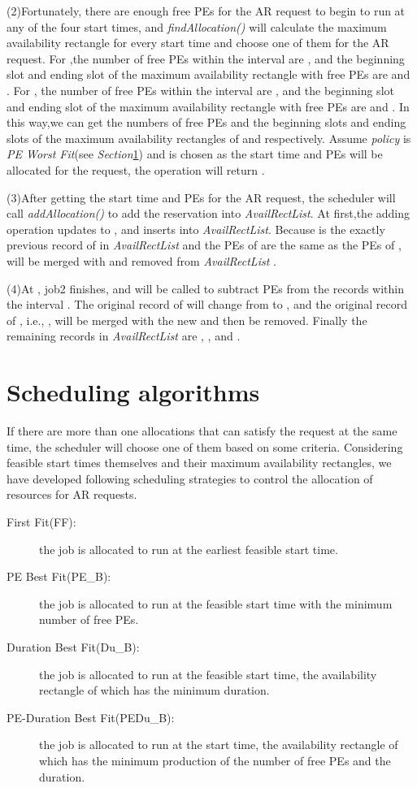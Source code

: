 \documentclass[preprint,12pt]{elsarticle}
\begin{document}
(2)Fortunately, there are enough free PEs for the AR request to begin to run at any of the four start times, and \emph{findAllocation()} will calculate the maximum availability rectangle for every start time and choose one of them for the AR request. For ,the number of free PEs within the interval  are , and the beginning slot and ending slot of the maximum availability rectangle with  free PEs are  and . For , the number of free PEs within the interval  are , and the beginning slot and ending slot of the maximum availability rectangle with  free PEs are  and . In this way,we can get the numbers of free PEs and the beginning slots and ending slots of the maximum availability rectangles of  and  respectively. Assume \emph{policy} is \emph{PE Worst Fit}(see \emph{Section}\ref{sect:strategies}) and  is chosen as the start time and  PEs will be allocated for the request, the operation will return .

(3)After getting the start time and PEs for the AR request, the scheduler will call \emph{addAllocation()} to add the reservation into \emph{AvailRectList}. At first,the adding operation updates  to , and inserts  into \emph{AvailRectList}. Because is the exactly previous record of  in \emph{AvailRectList} and the  PEs of  are the same as the  PEs of ,  will be merged with  and removed from \emph{AvailRectList} .

(4)At , job2 finishes, and  will be called to subtract  PEs from the records within the interval . The original record of  will change from  to , and the original record of , i.e., , will be merged with the new  and then be removed. Finally the remaining records in \emph{AvailRectList} are , ,  and .


\section{Scheduling algorithms}
\label{sect:strategies}
If there are more than one allocations that can satisfy the request at the same time, the scheduler will choose one of them based on some criteria. Considering feasible start times themselves and their maximum availability rectangles, we have developed following scheduling strategies to control the allocation of resources for AR requests.

\begin{description}
  \item[First Fit(FF):] the job is allocated to run at the earliest feasible start time.
  \item[PE Best Fit(PE\_B):] the job is allocated to run at the feasible start time with the minimum number of free PEs.

  \item[Duration Best Fit(Du\_B):] the job is allocated to run at the feasible start time, the availability rectangle of which has the minimum duration.

  \item[PE-Duration Best Fit(PEDu\_B):] the job is allocated to run at the start time, the availability rectangle of which has the minimum production of the number of free PEs and the duration.
\end{description}
\end{document}
